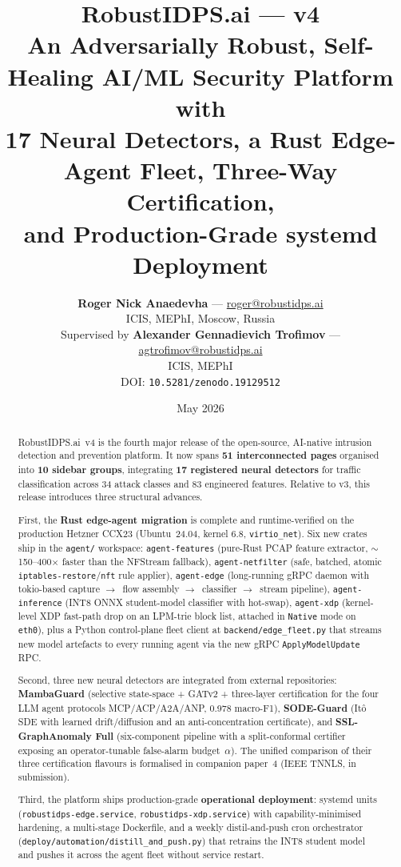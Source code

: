 \documentclass[11pt,a4paper]{article}
\title{%
  \vspace{-1cm}
  {\LARGE\bfseries RobustIDPS.ai --- v4}\\[6pt]
  {\large An Adversarially Robust, Self-Healing AI/ML Security Platform with\\
   17 Neural Detectors, a Rust Edge-Agent Fleet, Three-Way Certification,\\
   and Production-Grade systemd Deployment}}
\author{%
  \textbf{Roger Nick Anaedevha} --- \href{mailto:roger@robustidps.ai}{roger@robustidps.ai}\\
  ICIS, MEPhI, Moscow, Russia\\[6pt]
  Supervised by \textbf{Alexander Gennadievich Trofimov} --- \href{mailto:agtrofimov@robustidps.ai}{agtrofimov@robustidps.ai}\\
  ICIS, MEPhI\\[8pt]
  \normalsize DOI: \texttt{10.5281/zenodo.19129512}}
\date{May 2026}
\begin{document}
\maketitle
\thispagestyle{fancy}

\begin{abstract}
\noindent
RobustIDPS.ai~v4 is the fourth major release of the open-source, AI-native
intrusion detection and prevention platform.  It now spans \textbf{51
interconnected pages} organised into \textbf{10 sidebar groups},
integrating \textbf{17 registered neural detectors} for traffic
classification across 34 attack classes and 83 engineered features.
Relative to v3, this release introduces three structural advances.

First, the \textbf{Rust edge-agent migration} is complete and
runtime-verified on the production Hetzner CCX23 (Ubuntu~24.04, kernel
6.8, \texttt{virtio\_net}).  Six new crates ship in the
\texttt{agent/} workspace: \texttt{agent-features} (pure-Rust PCAP
feature extractor, $\sim$150--400$\times$ faster than the NFStream
fallback), \texttt{agent-netfilter} (safe, batched, atomic
\texttt{iptables-restore}/\texttt{nft} rule applier), \texttt{agent-edge}
(long-running gRPC daemon with tokio-based capture
$\to$~flow assembly $\to$~classifier $\to$~stream pipeline),
\texttt{agent-inference} (INT8 ONNX student-model classifier with hot-swap),
\texttt{agent-xdp} (kernel-level XDP fast-path drop on an LPM-trie block
list, attached in \texttt{Native} mode on \texttt{eth0}), plus a Python
control-plane fleet client at \texttt{backend/edge\_fleet.py} that streams
new model artefacts to every running agent via the new gRPC
\texttt{ApplyModelUpdate} RPC.

Second, three new neural detectors are integrated from external
repositories: \textbf{MambaGuard} (selective state-space + GATv2 +
three-layer certification for the four LLM agent protocols
MCP/ACP/A2A/ANP, 0.978 macro-F1), \textbf{SODE-Guard} (It\^o SDE with
learned drift/diffusion and an anti-concentration certificate), and
\textbf{SSL-GraphAnomaly Full} (six-component pipeline with a
split-conformal certifier exposing an operator-tunable false-alarm
budget~$\alpha$).  The unified comparison of their three certification
flavours is formalised in companion paper~4 (IEEE TNNLS, in submission).

Third, the platform ships production-grade \textbf{operational
deployment}: systemd units (\texttt{robustidps-edge.service},
\texttt{robustidps-xdp.service}) with capability-minimised hardening, a
multi-stage Dockerfile, and a weekly distil-and-push cron orchestrator
(\texttt{deploy/automation/distill\_and\_push.py}) that retrains the INT8
student model and pushes it across the agent fleet without service
restart.
\end{abstract}
\end{document}
